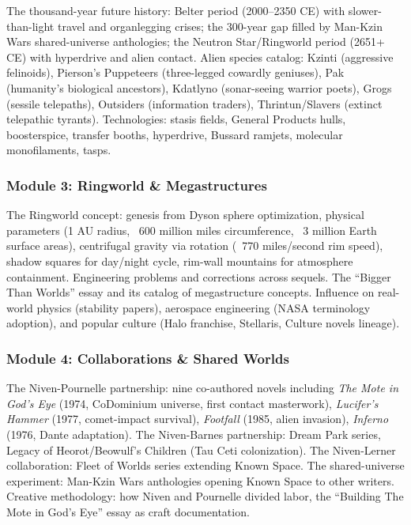 \documentclass[11pt,letterpaper]{article}
\begin{document}
The thousand-year future history: Belter period (2000--2350 CE) with slower-than-light travel and organlegging crises; the 300-year gap filled by Man-Kzin Wars shared-universe anthologies; the Neutron Star/Ringworld period (2651+ CE) with hyperdrive and alien contact. Alien species catalog: Kzinti (aggressive felinoids), Pierson's Puppeteers (three-legged cowardly geniuses), Pak (humanity's biological ancestors), Kdatlyno (sonar-seeing warrior poets), Grogs (sessile telepaths), Outsiders (information traders), Thrintun/Slavers (extinct telepathic tyrants). Technologies: stasis fields, General Products hulls, boosterspice, transfer booths, hyperdrive, Bussard ramjets, molecular monofilaments, tasps.

\subsubsection{Module 3: Ringworld \& Megastructures}

The Ringworld concept: genesis from Dyson sphere optimization, physical parameters (1 AU radius, ~600 million miles circumference, ~3 million Earth surface areas), centrifugal gravity via rotation (~770 miles/second rim speed), shadow squares for day/night cycle, rim-wall mountains for atmosphere containment. Engineering problems and corrections across sequels. The ``Bigger Than Worlds'' essay and its catalog of megastructure concepts. Influence on real-world physics (stability papers), aerospace engineering (NASA terminology adoption), and popular culture (Halo franchise, Stellaris, Culture novels lineage).

\subsubsection{Module 4: Collaborations \& Shared Worlds}

The Niven-Pournelle partnership: nine co-authored novels including \textit{The Mote in God's Eye} (1974, CoDominium universe, first contact masterwork), \textit{Lucifer's Hammer} (1977, comet-impact survival), \textit{Footfall} (1985, alien invasion), \textit{Inferno} (1976, Dante adaptation). The Niven-Barnes partnership: Dream Park series, Legacy of Heorot/Beowulf's Children (Tau Ceti colonization). The Niven-Lerner collaboration: Fleet of Worlds series extending Known Space. The shared-universe experiment: Man-Kzin Wars anthologies opening Known Space to other writers. Creative methodology: how Niven and Pournelle divided labor, the ``Building The Mote in God's Eye'' essay as craft documentation.
\end{document}
